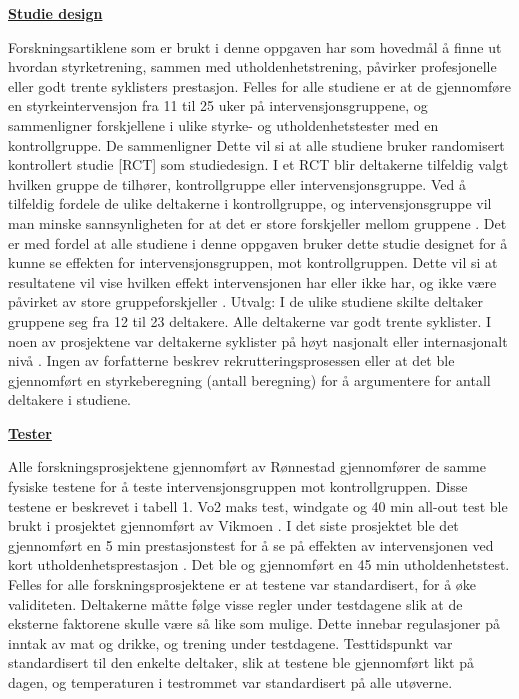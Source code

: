 \documentclass[
]{book}
\begin{document}
\underline{\textbf{Studie design}}

Forskningsartiklene som er brukt i denne oppgaven har som hovedmål å finne ut hvordan styrketrening, sammen med utholdenhetstrening, påvirker profesjonelle eller godt trente syklisters prestasjon. Felles for alle studiene er at de gjennomføre en styrkeintervensjon fra 11 til 25 uker på intervensjonsgruppene, og sammenligner forskjellene i ulike styrke- og utholdenhetstester med en kontrollgruppe. De sammenligner Dette vil si at alle studiene bruker randomisert kontrollert studie {[}RCT{]} som studiedesign. I et RCT blir deltakerne tilfeldig valgt hvilken gruppe de tilhører, kontrollgruppe eller intervensjonsgruppe. Ved å tilfeldig fordele de ulike deltakerne i kontrollgruppe, og intervensjonsgruppe vil man minske sannsynligheten for at det er store forskjeller mellom gruppene \citep{hulley2013, Parab2010}. Det er med fordel at alle studiene i denne oppgaven bruker dette studie designet for å kunne se effekten for intervensjonsgruppen, mot kontrollgruppen. Dette vil si at resultatene vil vise hvilken effekt intervensjonen har eller ikke har, og ikke være påvirket av store gruppeforskjeller \citep{helsebiblioteketuå} . Utvalg: I de ulike studiene skilte deltaker gruppene seg fra 12 til 23 deltakere. Alle deltakerne var godt trente syklister. I noen av prosjektene var deltakerne syklister på høyt nasjonalt eller internasjonalt nivå \citep{rønnestad2010a, rønnestad2010b, rønnestad2015, aagaard2011}. Ingen av forfatterne beskrev rekrutteringsprosessen eller at det ble gjennomført en styrkeberegning (antall beregning) for å argumentere for antall deltakere i studiene.

\underline{\textbf{Tester}}

Alle forskningsprosjektene gjennomført av Rønnestad \citep{rønnestad2010a, rønnestad2010b, rønnestad2015} gjennomfører de samme fysiske testene for å teste intervensjonsgruppen mot kontrollgruppen. Disse testene er beskrevet i tabell 1. Vo2 maks test, windgate og 40 min all-out test ble brukt i prosjektet gjennomført av Vikmoen \citep{vikmoen2016}. I det siste prosjektet ble det gjennomført en 5 min prestasjonstest for å se på effekten av intervensjonen ved kort utholdenhetsprestasjon \citep{aagaard2011}. Det ble og gjennomført en 45 min utholdenhetstest. Felles for alle forskningsprosjektene er at testene var standardisert, for å øke validiteten. Deltakerne måtte følge visse regler under testdagene slik at de eksterne faktorene skulle være så like som mulige. Dette innebar regulasjoner på inntak av mat og drikke, og trening under testdagene. Testtidspunkt var standardisert til den enkelte deltaker, slik at testene ble gjennomført likt på dagen, og temperaturen i testrommet var standardisert på alle utøverne.
\end{document}
